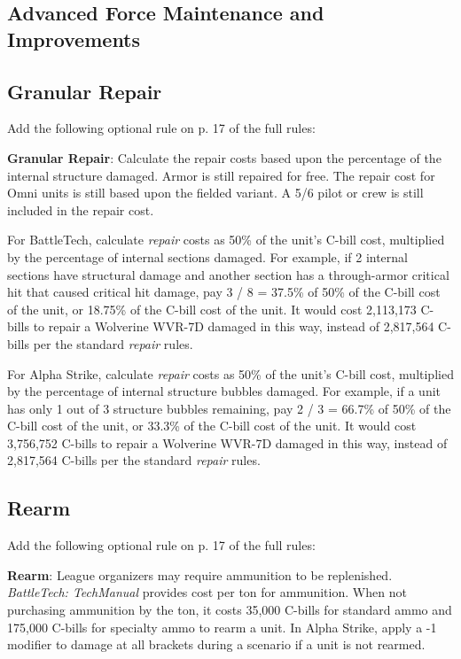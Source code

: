 \subsection{Advanced Force Maintenance and Improvements}

\subsection{Granular Repair}

Add the following optional rule on p. 17 of the full rules:

{\bfseries Granular Repair}: Calculate the repair costs based upon the percentage of the internal structure damaged.
Armor is still repaired for free.
The repair cost for Omni units is still based upon the fielded variant.
A 5/6 pilot or crew is still included in the repair cost.

For BattleTech, calculate \emph{repair} costs as 50\% of the unit's C-bill cost, multiplied by the percentage of internal sections damaged.
For example, if 2 internal sections have structural damage and another section has a through-armor critical hit that caused critical hit damage, pay 3 / 8 = 37.5\% of 50\% of the C-bill cost of the unit, or 18.75\% of the C-bill cost of the unit.
It would cost 2,113,173 C-bills to repair a Wolverine WVR-7D damaged in this way, instead of 2,817,564 C-bills per the standard \emph{repair} rules.

For Alpha Strike, calculate \emph{repair} costs as 50\% of the unit's C-bill cost, multiplied by the percentage of internal structure bubbles damaged.
For example, if a unit has only 1 out of 3 structure bubbles remaining, pay 2 / 3 = 66.7\% of 50\% of the C-bill cost of the unit, or 33.3\% of the C-bill cost of the unit.
It would cost 3,756,752 C-bills to repair a Wolverine WVR-7D damaged in this way, instead of 2,817,564 C-bills per the standard \emph{repair} rules.

\subsection{Rearm}

Add the following optional rule on p. 17 of the full rules:

{\bfseries Rearm}: League organizers may require ammunition to be replenished.
\emph{BattleTech: TechManual} provides cost per ton for ammunition.
When not purchasing ammunition by the ton, it costs 35,000 C-bills for standard ammo and 175,000 C-bills for specialty ammo to rearm a unit.
In Alpha Strike, apply a -1 modifier to damage at all brackets during a scenario if a unit is not rearmed.

